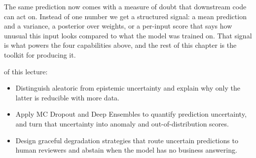 The same prediction now comes with a measure of doubt that downstream code can act on.
Instead of one number we get a structured signal: a mean prediction and a variance, a posterior over weights, or a per-input score that says how unusual this input looks compared to what the model was trained on.
That signal is what powers the four capabilities above, and the rest of this chapter is the toolkit for producing it.

\begin{marginfigure}
\centering
{}
\caption{Two prediction profiles for the same kind of input. Solid: peaked, no uncertainty signal. Dashed: flat, high epistemic uncertainty. Both predict the same top class, but only the second tells you the model is unsure.}
\label{fig:profile_overlay}
\end{marginfigure}

\vspace{2.5em}

 of this lecture:
\begin{itemize}
    \item Distinguish aleatoric from epistemic uncertainty and explain why only the latter is reducible with more data.
    \item Apply MC Dropout and Deep Ensembles to quantify prediction uncertainty, and turn that uncertainty into anomaly and out-of-distribution scores.
    \item Design graceful degradation strategies that route uncertain predictions to human reviewers and abstain when the model has no business answering.
\end{itemize}












